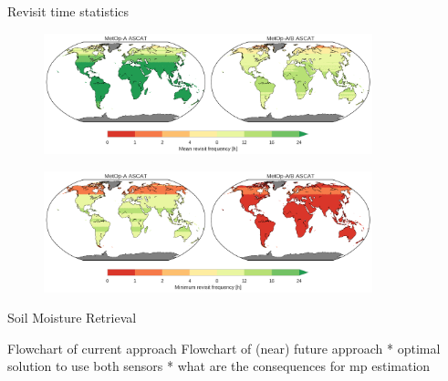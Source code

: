 \documentclass[10pt,ignorenonframetext,xcolor={dvipsnames, table}]{beamer}
\begin{document}
\begin{frame}{Revisit time statistics}

\begin{figure}
\includegraphics[width=0.85\textwidth]{./figures/revisit_freq_map_mean.png}
\end{figure}

\begin{figure}
\includegraphics[width=0.85\textwidth]{./figures/revisit_freq_map_min.png}
\end{figure}

\end{frame}

\begin{frame}{Soil Moisture Retrieval}

Flowchart of current approach Flowchart of (near) future approach *
optimal solution to use both sensors * what are the consequences for mp
estimation

\end{frame}
\end{document}
